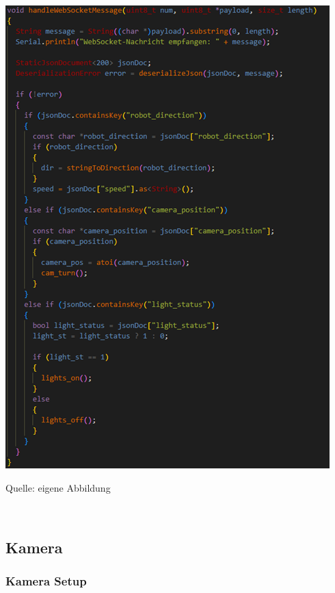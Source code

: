 \documentclass[ngerman,12pt,a4paper]{article}
\begin{document}
	\begin{center}
		\begin{minipage}[t]{0.85\textwidth}
			\includegraphics{Pictures/handlewebsocketmessage}
			\label{fig:handlewebsocketmessage}
			\vspace{-10pt}
			\begin{center}
				\par\small Quelle: eigene Abbildung 
			\end{center}
		\end{minipage} \\[0.75cm]
	\end{center} \newpage
	\subsection{Kamera}
		
			\subsubsection{Kamera Setup}
			
\end{document}
